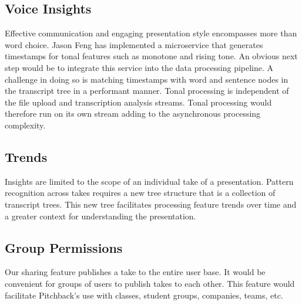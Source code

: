 \subsection*{Voice Insights}
Effective communication and engaging presentation style encompasses more than
word choice. Jason Feng has implemented a microservice that generates timestamps
for tonal features such as monotone and rising tone. An obvious next step would
be to integrate this service into the data processing pipeline. A challenge in
doing so is matching timestamps with word and sentence nodes in the transcript
tree in a performant manner. Tonal processing is independent of the file upload
and transcription analysis streams. Tonal processing would therefore run on its
own stream adding to the asynchronous processing complexity.

\subsection*{Trends}
Insights are limited to the scope of an individual take of a presentation.
Pattern recognition across takes requires a new tree structure that is a
collection of transcript trees. This new tree facilitates processing feature
trends over time and a greater context for understanding the presentation.

\subsection*{Group Permissions}
Our sharing feature publishes a take to the entire user base. It would be
convenient for groups of users to publish takes to each other. This feature
would facilitate Pitchback’s use with classes, student groups, companies, teams,
etc.

